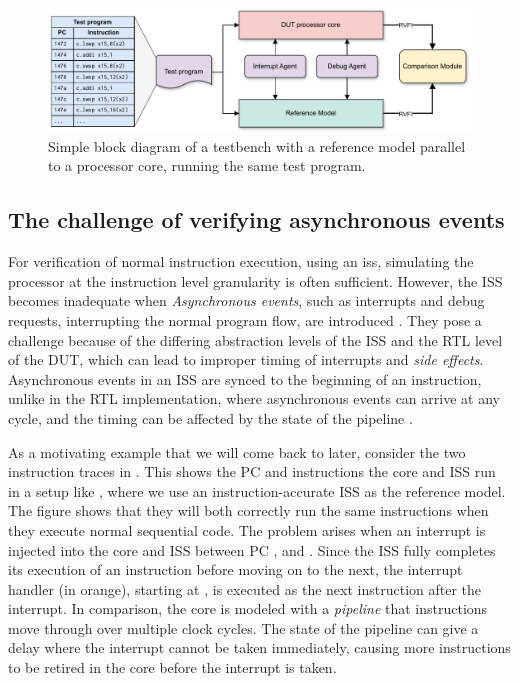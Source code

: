 \begin{figure}
    \centering
    \includegraphics[width=1.00\linewidth]{figures/ISS_Testbench.pdf}
    \caption{Simple block diagram of a testbench with a reference model parallel to a processor core, running the same test program. }
    \label{fig:testbench_block_diagram}
\end{figure}


\subsection{The challenge of verifying asynchronous events}

For verification of normal instruction execution, using an \acrfull{iss}, simulating the processor at the instruction level granularity is often sufficient. However, the ISS becomes inadequate when \textit{Asynchronous events}, such as interrupts and debug requests, interrupting the normal program flow, are introduced \cite{taylorAdvancedRISCVVerification2023}. They pose a challenge because of the differing abstraction levels of the ISS and the RTL level of the DUT, which can lead to improper timing of interrupts and \textit{side effects}. Asynchronous events in an ISS are synced to the beginning of an instruction, unlike in the RTL implementation, where asynchronous events can arrive at any cycle, and the timing can be affected by the state of the pipeline \cite{taylorAdvancedRISCVVerification2023}.

As a motivating example that we will come back to later, consider the two instruction traces in . This shows the PC and instructions the core and ISS run in a setup like , where we use an instruction-accurate ISS as the reference model. The figure shows that they will both correctly run the same instructions when they execute normal sequential code. The problem arises when an interrupt is injected into the core and ISS between PC , and . Since the ISS fully completes its execution of an instruction before moving on to the next, the interrupt handler (in orange), starting at , is executed as the next instruction after the interrupt. In comparison, the core is modeled with a \textit{pipeline} that instructions move through over multiple clock cycles. The state of the pipeline can give a delay where the interrupt cannot be taken immediately, causing more instructions to be retired in the core before the interrupt is taken. 

